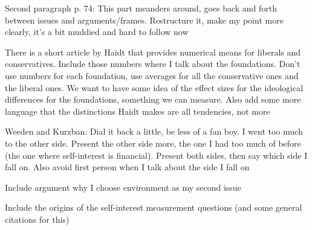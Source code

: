 \documentclass[12pt]{article}
\begin{document}
\begin{coi}
		\item Second paragraph p. 74: This part meanders around, goes back and forth between issues and arguments/frames. Restructure it, make my point more clearly, it's a bit muddied and hard to follow now
		\item There is a short article by Haidt that provides numerical means for liberals and conservatives. Include those numbers where I talk about the foundations. Don't use numbers for each foundation, use averages for all the conservative ones and the liberal ones. We want to have some idea of the effect sizes for the ideological differences for the foundations, something we can measure. Also add some more language that the distinctions Haidt makes are all tendencies, not more
		\item Weeden and Kurzban: Dial it back a little, be less of a fan boy. I went too much to the other side. Present the other side more, the one I had too much of before (the one where self-interest is financial). Present both sides, then say which side I fall on. Also avoid first person when I talk about the side I fall on
		\item Include argument why I choose environment as my second issue
		\item Include the origins of the self-interest measurement questions (and some general citations for this)
	\end{coi}
\end{document}
